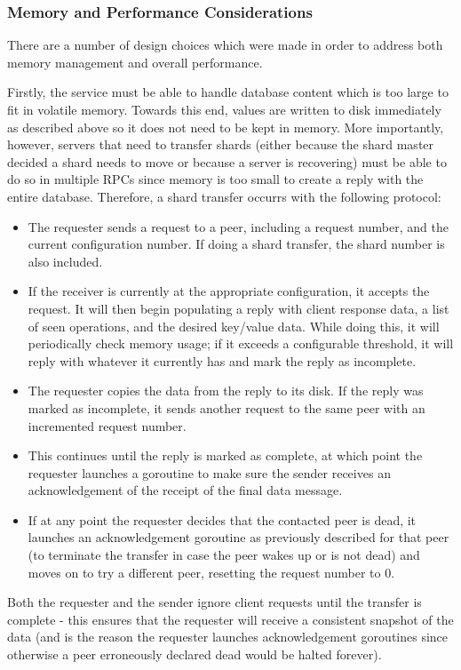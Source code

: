\documentclass[letterpaper,10pt]{article}
\begin{document}
\subsubsection{Memory and Performance Considerations}
There are a number of design choices which were made in order to address both memory management and overall performance.  

Firstly, the service must be able to handle database content which is too large to fit in volatile memory.  Towards this end, values are written to disk immediately as described above so it does not need to be kept in memory.  More importantly, however, servers that need to transfer shards (either because the shard master decided a shard needs to move or because a server is recovering) must be able to do so in multiple RPCs since memory is too small to create a reply with the entire database.  Therefore, a shard transfer occurrs with the following protocol:
\begin{itemize}
\item The requester sends a request to a peer, including a request number, and the current configuration number.  If doing a shard transfer, the shard number is also included.
\item If the receiver is currently at the appropriate configuration, it accepts the request.  It will then begin populating a reply with client response data, a list of seen operations, and the desired key/value data.  While doing this, it will periodically check memory usage; if it exceeds a configurable threshold, it will reply with whatever it currently has and mark the reply as incomplete.
\item The requester copies the data from the reply to its disk.  If the reply was marked as incomplete, it sends another request to the same peer with an incremented request number.
\item This continues until the reply is marked as complete, at which point the requester launches a goroutine to make sure the sender receives an acknowledgement of the receipt of the final data message.
\item If at any point the requester decides that the contacted peer is dead, it launches an acknowledgement goroutine as previously described for that peer (to terminate the transfer in case the peer wakes up or is not dead) and moves on to try a different peer, resetting the request number to 0.
\end{itemize}
Both the requester and the sender ignore client requests until the transfer is complete - this ensures that the requester will receive a consistent snapshot of the data (and is the reason the requester launches acknowledgement goroutines since otherwise a peer erroneously declared dead would be halted forever).
\end{document}
